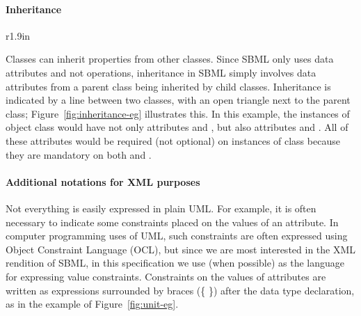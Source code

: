 \paragraph{Inheritance}

\begin{wrapfigure}[10]{r}{1.9in}
  \centering
  \small
  \vspace*{-7ex}
  \caption{Inheritance.}
  \label{fig:inheritance-eg}
\end{wrapfigure}
Classes can inherit properties from other classes.  Since SBML
only uses data attributes and not operations, inheritance in SBML
simply involves data attributes from a parent class being
inherited by child classes.  Inheritance is indicated by a line
between two classes, with an open triangle next to the parent
class; Figure~\ref{fig:inheritance-eg} illustrates this.  In this
example, the instances of object class  would have
not only attributes  and , but also attributes
 and .  All of these attributes would be
required (not optional) on instances of class 
because they are mandatory on both  and
.



\paragraph{Additional notations for XML purposes}

Not everything is easily expressed in plain UML.  For example, it
is often necessary to indicate some constraints placed on the
values of an attribute.  In computer programming uses of UML, such
constraints are often expressed using Object Constraint Language
(OCL), but since we are most interested in the XML rendition of
SBML, in this specification we use \xmlschemaone (when possible)
as the language for expressing value constraints.  Constraints on
the values of attributes are written as expressions surrounded by
braces (\{ \}) after the data type declaration, as in the example
of Figure~\ref{fig:unit-eg}.

